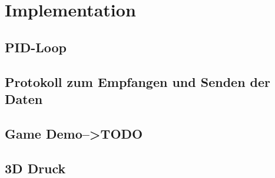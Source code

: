 \section{Implementation}

\subsection{PID-Loop}

\newpage

\subsection{Protokoll zum Empfangen und Senden der Daten}

\newpage

\subsection{Game Demo-->TODO} 

\newpage

\subsection{3D Druck} 

\newpage
